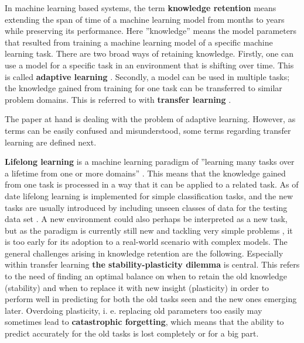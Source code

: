 


In machine learning based systems, the term \textbf{knowledge retention} means extending the span of time of a machine learning model from months to years while preserving its performance. Here ''knowledge'' means the model parameters that resulted from training a machine learning model of a specific machine learning task. There are two broad ways of retaining knowledge. Firstly, one can use a model for a specific task in an environment that is shifting over time. This is called \textbf{adaptive learning} \cite{conceptdriftsurvey}. Secondly, a model can be used in multiple tasks; the knowledge gained from training for one task can be transferred to similar problem domains. This is referred to with \textbf{transfer learning} \cite{lmlsystems}.

The paper at hand is dealing with the problem of adaptive learning. However, as terms can be easily confused and misunderstood, some terms regarding transfer learning are defined next.

\textbf{Lifelong learning} is a machine learning paradigm of ''learning many tasks over a lifetime from one or more domains'' \cite{lmlsystems}. This means that the knowledge gained from one task is processed in a way that it can be applied to a related task. As of date lifelong learning is implemented for simple classification tasks, and the new tasks are usually introduced by including unseen classes of data for the testing data set \cite{lmlinneuralnets}. A new environment could also perhaps be interpreted as a new task, but as the paradigm is currently still new and tackling very simple problems \cite{lmlinneuralnets}, it is too early for its adoption to a real-world scenario with complex models.
The general challenges arising in knowledge retention are the following. Especially within transfer learning \textbf{the stability-plasticity dilemma} is central. This refers to the need of finding an optimal balance on when to retain the old knowledge (stability) and when to replace it with new insight (plasticity) in order to perform well in predicting for both the old tasks seen and the new ones emerging later. Overdoing plasticity, i. e. replacing old parameters too easily may sometimes lead to \textbf{catastrophic forgetting}, which means that the ability to predict accurately for the old tasks is lost completely or for a big part.

